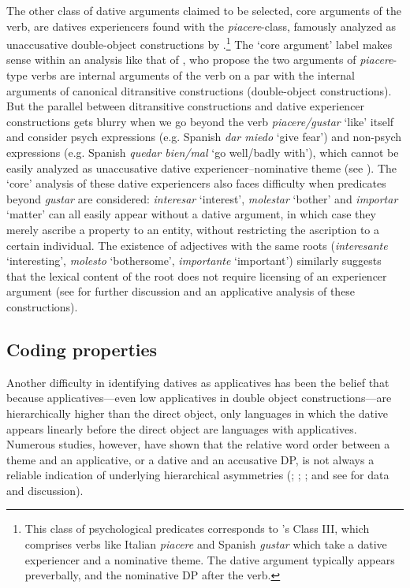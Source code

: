 \documentclass[output=paper,colorlinks,citecolor=brown,nonflat]{./langscibook}
\begin{document}
The other class of dative arguments claimed to be selected, core arguments of the verb, are datives experiencers found with the \textit{piacere}-class, famously analyzed as unaccusative double-object constructions by \citealt{BellettiRizzi1988}.\footnote{This class of psychological predicates corresponds to \citeauthor{BellettiRizzi1988}’s Class III, which comprises verbs like Italian \textit{piacere} and Spanish \textit{gustar} which take a dative experiencer and a nominative theme. The dative argument typically appears preverbally, and the nominative DP after the verb.}  The ‘core argument’ label makes sense within an analysis like that of \citeauthor{BellettiRizzi1988}, who propose the two arguments of \textit{piacere}-type verbs are internal arguments of the verb on a par with the internal arguments of canonical ditransitive constructions (double-object constructions).  But the parallel between ditransitive constructions and dative experiencer constructions gets blurry when we go beyond the verb \textit{piacere/gustar} ‘like’ itself and consider psych expressions (e.g. Spanish \textit{dar miedo} ‘give fear’) and non-psych expressions (e.g. Spanish \textit{quedar bien/mal} ‘go well/badly with’), which cannot be easily analyzed as unaccusative dative experiencer–nominative theme (see \citealt{Cuervo2011}). The ‘core’ analysis of these dative experiencers also faces difficulty when predicates beyond \textit{gustar} are considered: \textit{interesar} ‘interest’, \textit{molestar} ‘bother’ and \textit{importar} ‘matter’ can all easily appear without a dative argument, in which case they merely ascribe a property to an entity, without restricting the ascription to a certain individual. The existence of adjectives with the same roots (\textit{interesante} ‘interesting’, \textit{molesto} ‘bothersome’, \textit{importante} ‘important’) similarly suggests that the lexical content of the root does not require licensing of an experiencer argument (see  for further discussion and an applicative analysis of these constructions).

\subsection{Coding properties}\label{sec:cuervo:2.2}

Another difficulty in identifying datives as applicatives has been the belief that because applicatives—even low applicatives in double object constructions—are hierarchically higher than the direct object, only languages in which the dative appears linearly before the direct object are languages with applicatives. Numerous studies, however, have shown that the relative word order between a theme and an applicative, or a dative and an accusative DP, is not always a reliable indication of underlying hierarchical asymmetries (; ; \citealt{Cuervo2003, Demonte1995, MiyagawaTsujioka2004}; and see \citealt{McGinnis2018} for data and discussion).   
\end{document}
